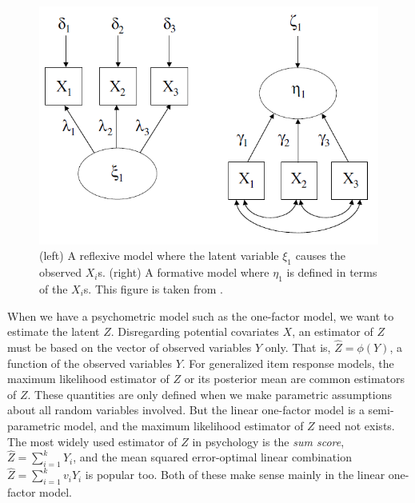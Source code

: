 \begin{figure}
\noindent \begin{centering}
\includegraphics[scale=0.5]{chunks/borsboom}
\par\end{centering}

\caption{\label{fig:dag}(left) A reflexive model where the latent variable $\xi_{1}$ causes the observed $X_{i}$s. (right) A formative model where $\eta_{1}$ is defined in terms of the $X_{i}$s. This figure is taken from \textcite[p. 61]{Borsboom2005-iq}.}
\end{figure}

When we have a psychometric model such as the one-factor model, we want to estimate the latent $Z$. Disregarding potential covariates $X$, an estimator of $Z$ must be based on the vector of observed variables $Y$ only. That is, $\hat{Z}=\phi(Y)$, a function of the observed variables $Y$. For generalized item response models, the maximum likelihood estimator of $Z$ or its posterior mean are common estimators of $Z$. These quantities are only defined when we make parametric assumptions about all random variables involved. But the linear one-factor model is a semi-parametric model, and the maximum likelihood estimator of $Z$ need not exists. The most widely used estimator of $Z$ in psychology is the \emph{sum
score}, $\hat{Z}=\sum_{i=1}^{k}Y_{i}$, and the mean squared error-optimal linear combination $\hat{Z}=\sum_{i=1}^{k}v_{i}Y_{i}$ is popular too. Both of these make sense mainly in the linear one-factor model. 

